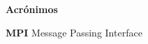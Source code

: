 %
%
%






\begin{flushleft}
	\huge{\textbf{Acrónimos}}
\end{flushleft}


\textbf{MPI} Message Passing Interface 





